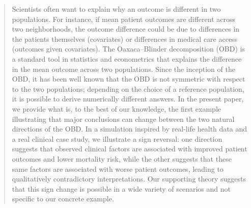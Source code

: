 \begin{abstract}
    Scientists often want to explain why an outcome is different in two
populations.
For instance, if mean patient outcomes are different across two neighborhoods, the outcome difference could be due to differences in the patients themselves (covariates) or differences in medical care access (outcomes given covariates).
The Oaxaca--Blinder decomposition (OBD) is a standard tool in statistics and econometrics that explains the difference in the mean outcome
across two populations. Since the inception of the OBD, it has been well known that the OBD is not symmetric with respect to the two populations; depending on the choice of a reference population, it is possible to derive numerically different answers. In the present paper, we provide what is, to the best of our knowledge, the first example illustrating that major conclusions can change between the two natural directions of the OBD. In a simulation inspired by real-life health data and a real clinical case study, we illustrate a sign reversal: one direction suggests that observed clinical factors are associated with improved patient outcomes and lower mortality risk, while the other suggests that these same factors are associated with worse patient outcomes, leading to qualitatively contradictory interpretations. Our supporting theory suggests that this sign change is possible in a wide variety of scenarios and not specific to our concrete example.


\end{abstract}
